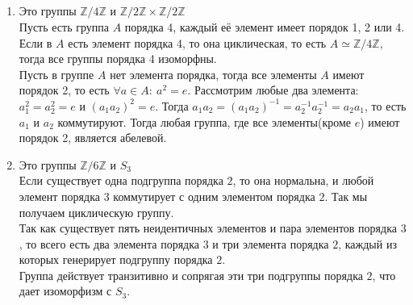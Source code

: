 		\subsection{}
		\begin{enumerate}
			\item Это группы $\mathbb{Z} \slash 4 \mathbb{Z}$ и $\mathbb{Z} \slash 2 \mathbb{Z} \times \mathbb{Z} \slash 2 \mathbb{Z}$\\
			Пусть есть группа $A$ порядка 4, каждый её элемент имеет порядок 1, 2 или 4. Если в $A$ есть элемент порядка 4, то она циклическая, то есть $A \simeq \mathbb{Z} \slash 4 \mathbb{Z}$, тогда все группы порядка 4 изоморфны.\\
			Пусть в группе $A$ нет элемента порядка, тогда все элементы $A$ имеют порядок 2, то есть $\forall a \in A:\ a^2 = e$. Рассмотрим любые два элемента: $a_1^{2} = a_2^{2} = e$ и $(a_1 a_2)^{2} = e$. Тогда $a_1 a_2 = (a_1 a_2)^{-1} = a_2^{-1} a_2^{-1} = a_2 a_1$, то есть $a_1$ и $a_2$ коммутируют. Тогда любая группа, где все элементы(кроме $e$) имеют порядок 2, является абелевой.\\
			
			\item Это группы $\mathbb{Z} \slash 6 \mathbb{Z}$ и $S_3$\\
			Если существует одна подгруппа порядка $2$, то она нормальна, и любой элемент порядка $3$ коммутирует с одним элементом порядка $2$. Так мы получаем циклическую группу.\\
			Так как существует пять неидентичных элементов и пара элементов порядка $3$, то всего есть два элемента порядка $3$ и три элемента порядка $2$, каждый из которых генерирует подгруппу порядка $2$.\\		
			Группа действует транзитивно и сопрягая эти три подгруппы порядка $2$, что дает изоморфизм с $S_3$.\\
			

\end{enumerate}
